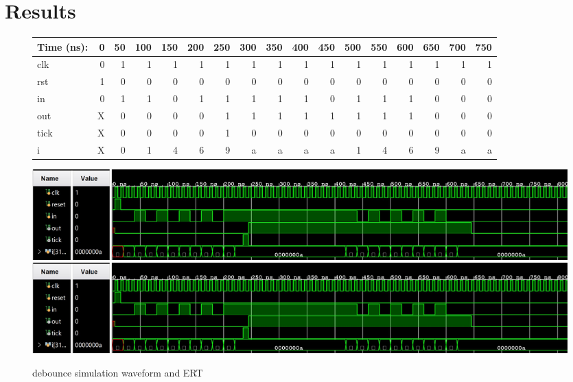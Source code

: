\documentclass[11pt]{article}
\begin{document}
\clearpage
\section*{Results}

\begin{figure}[ht]\centering
	\begin{tabular}{l|rrrrrrrrrrrrrrrr}
		Time (ns): & 0 & 50 & 100 & 150 & 200  & 250 & 300 & 350 & 400 & 450 & 500 & 550 & 600 & 650 & 700  & 750\\
		\midrule
		clk & 0 & 1 & 1 & 1 & 1 & 1 & 1 & 1 & 1 & 1 & 1 & 1 & 1 & 1 & 1 & 1\\
		rst & 1 & 0 & 0 & 0 & 0 & 0 & 0 & 0 & 0 & 0 & 0 & 0 & 0 & 0 & 0 & 0 \\
		in & 0 & 1 & 1 & 0 & 1 & 1 & 1 & 1 & 1 & 0 & 1 & 1 & 1 & 0 & 0 & 0 \\
		\midrule
		out & X & 0 & 0 & 0 & 0 & 1 & 1 & 1 & 1 & 1 & 1 & 1 & 1 & 0 & 0 & 0 \\
		tick & X & 0 & 0 & 0 & 0 & 1 & 0 & 0 & 0 & 0 & 0 & 0 & 0 & 0 & 0 & 0 \\
		i & X & 0 & 1 & 4 & 6 & 9 & a & a & a & a & 1 & 4 & 6 & 9 & a & a \\
		\bottomrule
	\end{tabular}\medskip
	
	\includegraphics[trim=0cm 0cm 11cm 0cm, clip]{debounce_test.JPG}
	\includegraphics[trim=15cm 0cm 2cm 0cm, clip]{debounce_test.JPG}
	\caption{debounce simulation waveform and ERT}
	\label{fig:sim_with_table}
\end{figure}
\end{document}
